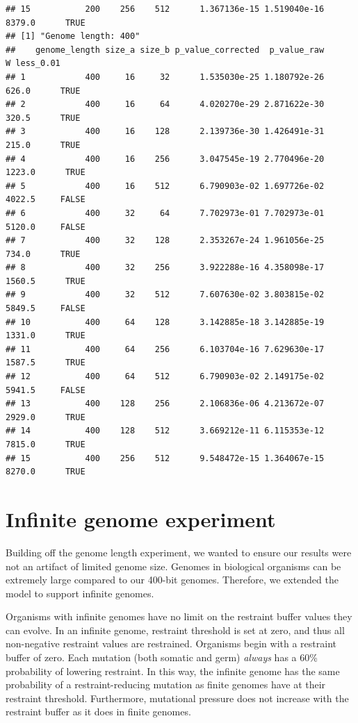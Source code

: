 \documentclass[
]{book}
\begin{document}
\begin{verbatim}
## 15           200    256    512      1.367136e-15 1.519040e-16 8379.0      TRUE
## [1] "Genome length: 400"
##    genome_length size_a size_b p_value_corrected  p_value_raw      W less_0.01
## 1            400     16     32      1.535030e-25 1.180792e-26  626.0      TRUE
## 2            400     16     64      4.020270e-29 2.871622e-30  320.5      TRUE
## 3            400     16    128      2.139736e-30 1.426491e-31  215.0      TRUE
## 4            400     16    256      3.047545e-19 2.770496e-20 1223.0      TRUE
## 5            400     16    512      6.790903e-02 1.697726e-02 4022.5     FALSE
## 6            400     32     64      7.702973e-01 7.702973e-01 5120.0     FALSE
## 7            400     32    128      2.353267e-24 1.961056e-25  734.0      TRUE
## 8            400     32    256      3.922288e-16 4.358098e-17 1560.5      TRUE
## 9            400     32    512      7.607630e-02 3.803815e-02 5849.5     FALSE
## 10           400     64    128      3.142885e-18 3.142885e-19 1331.0      TRUE
## 11           400     64    256      6.103704e-16 7.629630e-17 1587.5      TRUE
## 12           400     64    512      6.790903e-02 2.149175e-02 5941.5     FALSE
## 13           400    128    256      2.106836e-06 4.213672e-07 2929.0      TRUE
## 14           400    128    512      3.669212e-11 6.115353e-12 7815.0      TRUE
## 15           400    256    512      9.548472e-15 1.364067e-15 8270.0      TRUE
\end{verbatim}

\hypertarget{infinite-genome-experiment}{%
\chapter{Infinite genome experiment}\label{infinite-genome-experiment}}

Building off the genome length experiment, we wanted to ensure our results were not an artifact of limited genome size.
Genomes in biological organisms can be extremely large compared to our 400-bit genomes.
Therefore, we extended the model to support infinite genomes.

Organisms with infinite genomes have no limit on the restraint buffer values they can evolve.
In an infinite genome, restraint threshold is set at zero, and thus all non-negative restraint values are restrained.
Organisms begin with a restraint buffer of zero.
Each mutation (both somatic and germ) \emph{always} has a 60\% probability of lowering restraint.
In this way, the infinite genome has the same probability of a restraint-reducing mutation as finite genomes have at their restraint threshold.
Furthermore, mutational pressure does not increase with the restraint buffer as it does in finite genomes.
\end{document}
